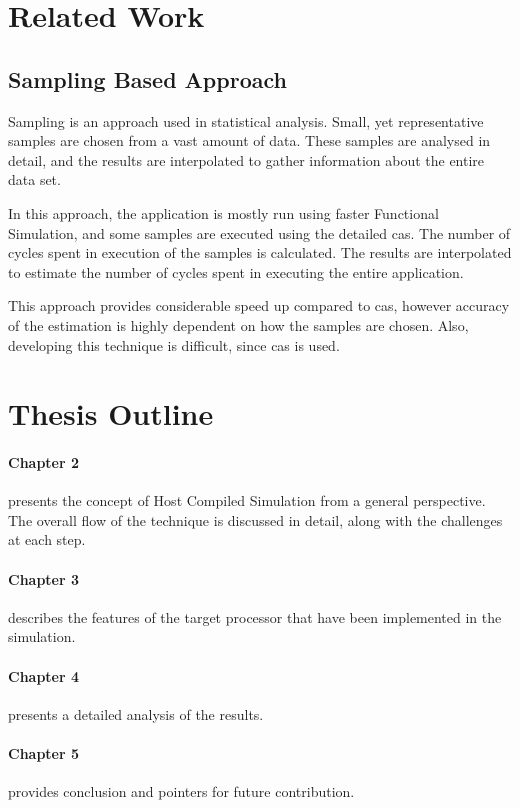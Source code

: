 \section{Related Work}

\subsection{Sampling Based Approach}
Sampling is an approach used in statistical analysis. Small, yet representative samples are chosen from a vast amount of data. These samples are analysed in detail, and the results are interpolated to gather information about the entire data set.

In this approach, the application is mostly run using faster Functional Simulation, and some samples are executed using the detailed \gls{cas}. The number of cycles spent in execution of the samples is calculated. The results are interpolated to estimate the number of cycles spent in executing the entire application.

This approach provides considerable speed up compared to \gls{cas}, however accuracy of the estimation is highly dependent on how the samples are chosen. Also, developing this technique is difficult, since \gls{cas} is used.

\section{Thesis Outline}
\paragraph{Chapter 2} presents the concept of Host Compiled Simulation from a general perspective. The overall flow of the technique is discussed in detail, along with the challenges at each step.

\vspace*{-15pt}
\paragraph{Chapter 3} describes the features of the target processor that have been implemented in the simulation.

\vspace*{-15pt}
\paragraph{Chapter 4} presents a detailed analysis of the results.

\vspace*{-15pt}
\paragraph{Chapter 5} provides conclusion and pointers for future contribution.